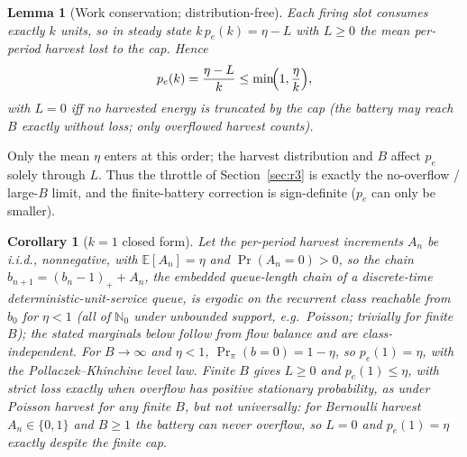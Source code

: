 \documentclass[twocolumn,3p,times,procedia]{elsarticle}
\theoremstyle{plain}
\newtheorem{lemma}{Lemma}
\newtheorem{corollary}{Corollary}
\theoremstyle{remark}
\newcommand{\E}{\mathbb{E}}
\newcommand{\Prob}{\Pr}
\newcommand{\peff}{p_e}
\begin{document}
\begin{lemma}[Work conservation; distribution-free]\label{lem:work}
Each firing slot consumes exactly $k$ units, so in steady state
$k\,\peff(k)=\eta-L$ with $L\ge0$ the mean per-period harvest lost to the
cap. Hence
\begin{equation}
\peff(k)=\frac{\eta-L}{k}\le\min\!\Bigl(1,\frac{\eta}{k}\Bigr),
\end{equation}
with $L=0$ iff no harvested energy is truncated by the cap (the battery
may reach $B$ exactly without loss; only overflowed harvest counts).
\end{lemma}

Only the mean $\eta$ enters at this order; the harvest distribution and
$B$ affect $\peff$ solely through $L$. Thus the throttle of
Section~\ref{sec:r3} is exactly the no-overflow / large-$B$ limit, and
the finite-battery correction is sign-definite ($\peff$ can only be
smaller).

\begin{corollary}[$k=1$ closed form]
Let the per-period harvest increments $A_n$ be i.i.d., nonnegative,
with $\E[A_n]=\eta$ and $\Prob(A_n{=}0)>0$, so the chain
$b_{n+1}=(b_n-1)_+ + A_n$, the
embedded queue-length chain of a discrete-time deterministic-unit-service
queue, is ergodic on the recurrent class reachable from $b_0$ for
$\eta<1$ (all of $\mathbb{N}_0$ under unbounded support, e.g.\
Poisson; trivially for finite $B$); the stated marginals below follow
from flow balance and are class-independent. For $B\to\infty$ and
$\eta<1$, $\Prob_\pi(b=0)=1-\eta$, so $\peff(1)=\eta$, with the
Pollaczek--Khinchine level law. Finite $B$ gives $L\ge0$ and
$\peff(1)\le\eta$, with \emph{strict} loss exactly when overflow has
positive stationary probability, as under Poisson harvest for any
finite $B$, but not universally: for Bernoulli harvest
$A_n\in\{0,1\}$ and $B\ge1$ the battery can never overflow, so $L=0$
and $\peff(1)=\eta$ exactly despite the finite cap.
\end{corollary}
\end{document}
